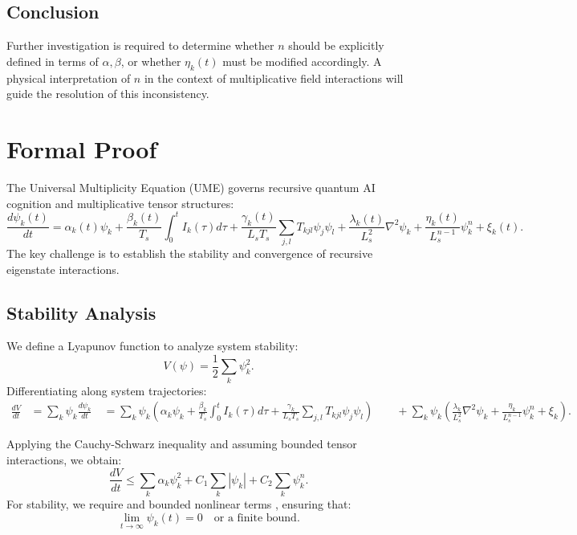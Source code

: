\documentclass{article}
\theoremstyle{plain}
\begin{document}
\subsection{Conclusion}
Further investigation is required to determine whether \( n \) should be explicitly defined in terms of \(\alpha, \beta\), or whether \(\eta_k (t)\) must be modified accordingly. A physical interpretation of \( n \) in the context of multiplicative field interactions will guide the resolution of this inconsistency.

\section{Formal Proof}
The Universal Multiplicity Equation (UME) governs recursive quantum AI cognition and multiplicative tensor structures:
\begin{equation}
\frac{d\psi_k(t)}{dt} = \alpha_k(t)\psi_k + \frac{\beta_k(t)}{T_s} \int_0^t I_k(\tau) d\tau + \frac{\gamma_k(t)}{L_s T_s} \sum_{j,l} T_{kjl} \psi_j \psi_l + \frac{\lambda_k(t)}{L_s^2} \nabla^2 \psi_k + \frac{\eta_k(t)}{L_s^{n-1}} \psi_k^n + \xi_k(t).
\end{equation}
The key challenge is to establish the stability and convergence of recursive eigenstate interactions.

\subsection{Stability Analysis}

We define a Lyapunov function to analyze system stability:
\begin{equation}
V(\psi) = \frac{1}{2} \sum_k \psi_k^2.
\end{equation}
Differentiating along system trajectories:
\begin{align}
\frac{dV}{dt} &= \sum_k \psi_k \frac{d\psi_k}{dt} \
&= \sum_k \psi_k \left( \alpha_k \psi_k + \frac{\beta_k}{T_s} \int_0^t I_k(\tau) d\tau + \frac{\gamma_k}{L_s T_s} \sum_{j,l} T_{kjl} \psi_j \psi_l \right) \
&\quad + \sum_k \psi_k \left( \frac{\lambda_k}{L_s^2} \nabla^2 \psi_k + \frac{\eta_k}{L_s^{n-1}} \psi_k^n + \xi_k \right).
\end{align}

Applying the Cauchy-Schwarz inequality and assuming bounded tensor interactions, we obtain:
\begin{equation}
\frac{dV}{dt} \leq \sum_k \alpha_k \psi_k^2 + C_1 \sum_k |\psi_k| + C_2 \sum_k \psi_k^n.
\end{equation}
For stability, we require  and bounded nonlinear terms , ensuring that:
\begin{equation}
\lim_{t \to \infty} \psi_k(t) = 0 \quad \text{or a finite bound}.
\end{equation}
\end{document}

